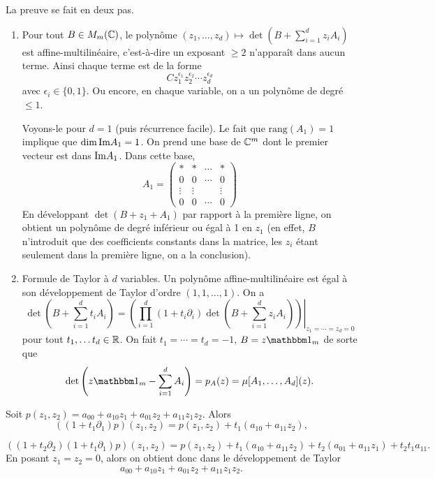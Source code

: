 \begin{preuve}
  La preuve se fait en deux pas.
  \begin{enumerate}
  \item Pour tout $B \in M_m(\mathbb{C})$, le polynôme $(z_1, \ldots, z_d) \mapsto \det \left( B + \sum_{i = 1}^{d}
      z_i A_i \right)$ est affine-multilinéaire, c'est-à-dire un exposant $\geq 2$ n'apparaît dans aucun
    terme. Ainsi chaque terme est de la forme 
    \[ C z_1^{\epsilon_1} z_2^{\epsilon_2} \cdots z_d^{\epsilon_d} \]
    avec $\epsilon_i \in \{0,1\}$. Ou encore, en chaque variable, on a un polynôme de degré $\leq 1$.

    Voyons-le pour $d = 1$ (puis récurrence facile). Le fait que $\mathrm{rang}(A_1) = 1$ implique que $\dim
    \mathrm{Im} A_1 = 1$. On prend une base de $\mathbb{C}^m$ dont le premier vecteur est dans $\mathrm{Im} A_1$. Dans cette base, 
    \[ A_1 =
      \begin{pmatrix}
        \ast & \ast & \cdots & \ast\\
        0 & 0 & \cdots & 0\\
        \vdots & \vdots & & \vdots\\
        0 & 0 & \cdots & 0
      \end{pmatrix}
    \]
    En développant $\det(B + z_1 + A_1)$ par rapport à la première ligne, on obtient un polynôme de degré
    inférieur ou égal à 1 en $z_1$ (en effet, $B$ n'introduit que des coefficients constants dans la matrice,
    les $z_i$ étant seulement dans la première ligne, on a la conclusion).

    
  \item Formule de Taylor à $d$ variables. Un polynôme affine-multilinéaire est égal à son développement de
    Taylor d'ordre $(1, 1, \ldots, 1)$. On a
    \[ \det \left( B + \sum_{i=1}^{d}t_i A_i \right) =  \left. \left(\prod_{i=1}^d \left(1 + t_i \partial_i\right) \det
          \left( B + \sum_{i = 1}^{d} z_i A_i \right)\right) \right |_{z_1 = \cdots = z_d = 0}\]
    pour tout $t_1, \ldots t_d \in \mathbb{R}$. On fait $t_1 = \cdots = t_d = -1$, $B = z \un_m$ de sorte que 
    \[ \det \left( z \un_m - \sum_{i = 1}^{d} A_i \right) = p_A(z) = \mu[A_1, \ldots, A_d](z). \]
  \end{enumerate}
\end{preuve}


\begin{ex}
  Soit $p(z_1, z_2) = a_{00} + a_{10} z_1 + a_{01} z_2 + a_{11}z_1 z_2$. Alors 
  \[ \left( (1 + t_1 \partial_1)p \right)(z_1,z_2) = p(z_1, z_2) + t_1(a_{10} + a_{11}z_2), \]
  
  \[ \left( (1 + t_2 \partial_2)(1 + t_1 \partial_1)p \right)(z_1, z_2) = p(z_1, z_2) + t_1(a_{10} +
    a_{11}z_2) + t_2(a_{01} + a_{11}z_1) + t_2t_1a_{11}. \]
  En posant $z_1 = z_2 = 0$, alors on obtient donc dans le développement de Taylor 
  \[ a_{00} + a_{10} z_1 + a_{01} z_2 + a_{11}z_1 z_2. \]
\end{ex}








